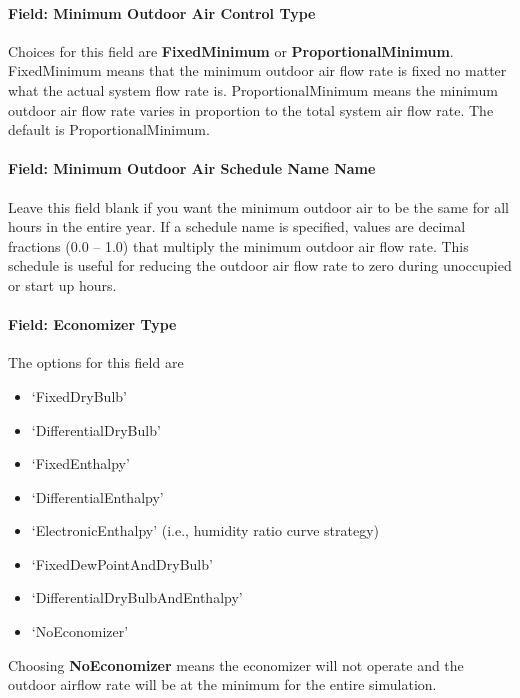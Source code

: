 \paragraph{Field: Minimum Outdoor Air Control Type}\label{field-minimum-outdoor-air-control-type-2}

Choices for this field are \textbf{FixedMinimum} or \textbf{ProportionalMinimum}. FixedMinimum means that the minimum outdoor air flow rate is fixed no matter what the actual system flow rate is. ProportionalMinimum means the minimum outdoor air flow rate varies in proportion to the total system air flow rate. The default is ProportionalMinimum.

\paragraph{Field: Minimum Outdoor Air Schedule Name Name}\label{field-minimum-outdoor-air-schedule-name-name-1}

Leave this field blank if you want the minimum outdoor air to be the same for all hours in the entire year. If a schedule name is specified, values are decimal fractions (0.0 -- 1.0) that multiply the minimum outdoor air flow rate. This schedule is useful for reducing the outdoor air flow rate to zero during unoccupied or start up hours.

\paragraph{Field: Economizer Type}\label{field-economizer-type-6}

The options for this field are

\begin{itemize}
\item
  `FixedDryBulb'
\item
  `DifferentialDryBulb'
\item
  `FixedEnthalpy'
\item
  `DifferentialEnthalpy'
\item
  `ElectronicEnthalpy' (i.e., humidity ratio curve strategy)
\item
  `FixedDewPointAndDryBulb'
\item
  `DifferentialDryBulbAndEnthalpy'
\item
  `NoEconomizer'
\end{itemize}

Choosing \textbf{NoEconomizer} means the economizer will not operate and the outdoor airflow rate will be at the minimum for the entire simulation.

